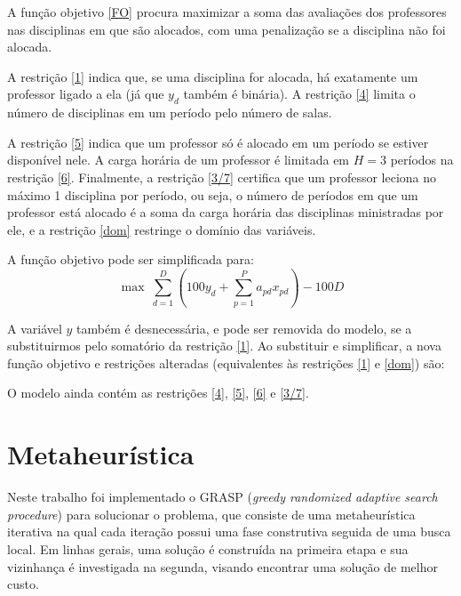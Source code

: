 \documentclass{MO824}
\newcommand{\B}{\mathbb{B}}
\begin{document}
    A função objetivo \eqref{FO} procura maximizar a soma das avaliações dos professores nas disciplinas em que são alocados, com uma penalização se a disciplina não foi alocada.
    
    A restrição \eqref{1} indica que, se uma disciplina for alocada, há exatamente um professor ligado a ela (já que $y_d$ também é binária). A restrição \eqref{4} limita o número de disciplinas em um período pelo número de salas.
    
    A restrição \eqref{5} indica que um professor só é alocado em um período se estiver disponível nele. A carga horária de um professor é limitada em $H=3$ períodos na restrição \eqref{6}. Finalmente, a restrição \eqref{3/7} certifica que um professor leciona no máximo 1 disciplina por período, ou seja, o número de períodos em que um professor está alocado é a soma da carga horária das disciplinas ministradas por ele, e a restrição \eqref{dom} restringe o domínio das variáveis.
    
    A função objetivo pode ser simplificada para:
    \begin{equation}
        \max~\sum_{d=1}^D (100y_d + \sum_{p=1}^P a_{pd}x_{pd}) - 100D
    \end{equation}
    
    A variável $y$ também é desnecessária, e pode ser removida do modelo, se a substituirmos pelo somatório da restrição \eqref{1}. Ao substituir e simplificar, a nova função objetivo e restrições alteradas (equivalentes às restrições \eqref{1} e \eqref{dom}) são:
    
    \begin{lpformulation}
        \lpeq[dom_ALT]{x_{pd}, z_{pt} \in \B}{p \in \{1\dots P\}, d \in \{1\dots D\}, t \in \{1\dots T\}}
    \end{lpformulation}
    
    O modelo ainda contém as restrições \eqref{4}, \eqref{5}, \eqref{6} e \eqref{3/7}.
    
\section{Metaheurística} \label{method}

Neste trabalho foi implementado o GRASP (\emph{greedy randomized adaptive search procedure}) \cite{grasp} para solucionar o problema, que consiste de uma metaheurística iterativa na qual cada iteração possui uma fase construtiva seguida de uma busca local. Em linhas gerais, uma solução é construída na primeira etapa e sua vizinhança é investigada na segunda, visando encontrar uma solução de melhor custo.
\end{document}
